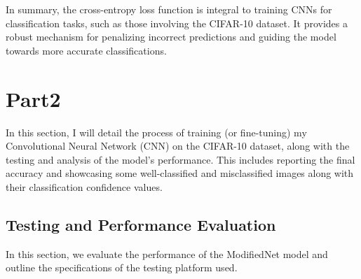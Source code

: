 \documentclass[conference]{IEEEtran}
\begin{document}
	In summary, the cross-entropy loss function is integral to training CNNs for classification tasks, such as those involving the CIFAR-10 dataset. It provides a robust mechanism for penalizing incorrect predictions and guiding the model towards more accurate classifications.
	
	\section{Part2}
	In this section, I will detail the process of training (or fine-tuning) my Convolutional Neural Network (CNN) on the CIFAR-10 dataset, along with the testing and analysis of the model's performance. This includes reporting the final accuracy and showcasing some well-classified and misclassified images along with their classification confidence values.
	
	\subsection{Testing and Performance Evaluation}
	In this section, we evaluate the performance of the ModifiedNet model and outline the specifications of the testing platform used.
	
\end{document}
